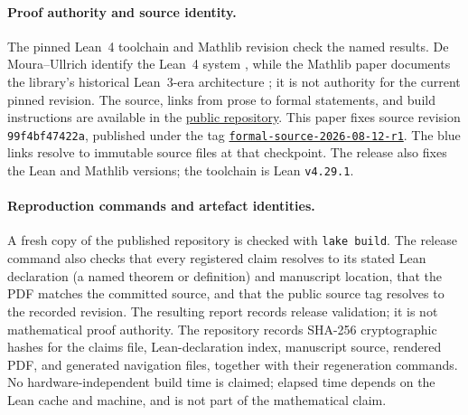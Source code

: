 \documentclass[11pt]{article}
\newcommand{\commitshort}{99f4bf47422a}
\theoremstyle{definition}
\theoremstyle{remark}
\begin{document}
\paragraph{Proof authority and source identity.}
The pinned Lean~4 toolchain and Mathlib revision check the named results.
De Moura--Ullrich identify the Lean~4 system
\cite[abstract and \S1, pp.~625--626]{lean}, while the Mathlib paper documents
the library's historical Lean~3-era architecture
\cite[abstract and \S1.1, p.~367]{mathlib}; it is not authority for the current
pinned revision.  The source, links from prose to formal statements, and build
instructions are available in the
\href{https://github.com/wcook04/plectis-erdos}{public repository}.
This paper fixes source revision \texttt{\commitshort}, published under
the tag
\href{https://github.com/wcook04/plectis-erdos/tree/formal-source-2026-08-12-r1}{\texttt{formal-source-2026-08-12-r1}}.
The blue links resolve to immutable source files at that checkpoint.
The release also fixes the Lean and Mathlib
versions; the toolchain is Lean \texttt{v4.29.1}.

\paragraph{Reproduction commands and artefact identities.}
A fresh copy of the published repository is checked with \texttt{lake build}.
The release command also checks that every registered claim resolves
to its stated Lean declaration (a named theorem or definition) and manuscript location, that the PDF matches
the committed source, and that the public source tag resolves to the recorded
revision.  The resulting report records release validation; it is not
mathematical proof authority.  The repository records SHA-256 cryptographic hashes for
the claims file, Lean-declaration index, manuscript source, rendered PDF, and
generated navigation files, together with their regeneration commands.  No
hardware-independent build time is claimed;
elapsed time depends on the Lean cache and machine, and is not part of the
mathematical claim.
\end{document}
